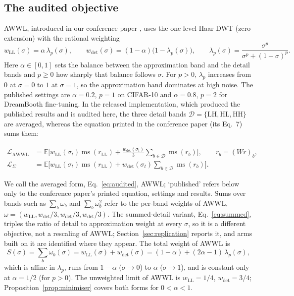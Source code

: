 \subsection{The audited objective}
\label{sec:family-awwl}

AWWL, introduced in our conference paper \citep{thao2026awwl}, uses the
one-level Haar DWT (zero extension) with the rational weighting
\begin{equation}
  w_{\mathrm{LL}}(\sigma) = \alpha\,\lambda_p(\sigma), \qquad
  w_{\det}(\sigma) = (1-\alpha)\big(1 - \lambda_p(\sigma)\big), \qquad
  \lambda_p(\sigma) = \frac{\sigma^{p}}{\sigma^{p} + (1-\sigma)^{p}} .
  \label{eq:weights}
\end{equation}
Here $\alpha \in [0,1]$ sets the balance between the approximation band and the
detail bands and $p \ge 0$ how sharply that balance follows $\sigma$. For
$p > 0$, $\lambda_p$ increases from $0$ at $\sigma = 0$ to $1$ at $\sigma = 1$,
so the approximation band dominates at high noise. The published settings are
$\alpha = 0.2$, $p = 1$ on CIFAR-10 and $\alpha = 0.8$, $p = 2$ for DreamBooth
fine-tuning. In the released implementation, which produced the published
results and is audited here, the three detail bands
$\mathcal{D} = \{\mathrm{LH},\mathrm{HL},\mathrm{HH}\}$ are averaged,
whereas the equation printed in the conference paper (its Eq.~7) sums them:
\begin{linenomath}
\begin{align}
  \mathcal{L}_{\mathrm{AWWL}}
  &= \mathbb{E}\Big[w_{\mathrm{LL}}(\sigma_t)\operatorname{ms}(r_{\mathrm{LL}})
    + \frac{w_{\det}(\sigma_t)}{3}
      \sum_{b \in \mathcal{D}} \operatorname{ms}(r_b)\Big],
  \qquad r_b = (W r)_b ,
  \label{eq:audited}\\
  \mathcal{L}_{\Sigma}
  &= \mathbb{E}\Big[w_{\mathrm{LL}}(\sigma_t)\operatorname{ms}(r_{\mathrm{LL}})
    + w_{\det}(\sigma_t)
      \sum_{b \in \mathcal{D}} \operatorname{ms}(r_b)\Big].
  \label{eq:summed}
\end{align}
\end{linenomath}
We call the averaged form, Eq.~\eqref{eq:audited}, AWWL; `published' refers
below only to the conference paper's printed equation, settings and results.
Sums over bands such as $\sum_b \omega_b$ and $\sum_b \omega_b^2$ refer to
the per-band weights of AWWL,
$\omega = (w_{\mathrm{LL}}, w_{\det}/3, w_{\det}/3, w_{\det}/3)$. The
summed-detail variant, Eq.~\eqref{eq:summed}, triples the ratio of detail to
approximation weight at every $\sigma$, so it is a different objective, not a
rescaling of AWWL; Section~\ref{sec:replication} reports it, and arms built on
it are identified where they appear. The total weight of AWWL is
\begin{equation}
  S(\sigma) = \sum_b \omega_b(\sigma) = w_{\mathrm{LL}}(\sigma) + w_{\det}(\sigma)
  = (1-\alpha) + (2\alpha - 1)\,\lambda_p(\sigma) ,
  \label{eq:total}
\end{equation}
which is affine in $\lambda_p$, runs from $1-\alpha$ ($\sigma \to 0$) to
$\alpha$ ($\sigma \to 1$), and is constant only at $\alpha = 1/2$ (for
$p > 0$). The unweighted limit of AWWL is $w_{\mathrm{LL}} = 1/4$,
$w_{\det} = 3/4$; Proposition~\ref{prop:minimiser} covers both forms for
$0 < \alpha < 1$.

